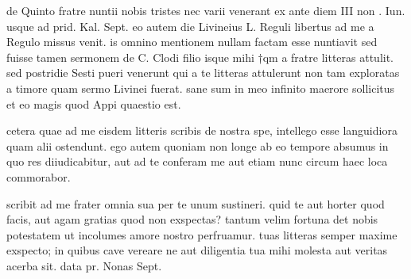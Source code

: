 


 de Quinto fratre nuntii nobis tristes nec varii venerant ex ante diem III non . Iun. usque ad prid. Kal. Sept. eo autem die Livineius L. Reguli libertus ad me a Regulo missus venit. is omnino mentionem nullam factam esse nuntiavit sed fuisse tamen sermonem de C. Clodi filio isque mihi †qm a fratre litteras attulit. sed postridie Sesti pueri venerunt qui a te litteras attulerunt non tam exploratas a timore quam sermo Livinei fuerat. sane sum in meo infinito maerore sollicitus et eo magis quod Appi quaestio est.

 cetera quae ad me eisdem litteris scribis de nostra spe, intellego esse languidiora quam alii ostendunt. ego autem quoniam non longe ab eo tempore absumus in quo res diiudicabitur, aut ad te conferam me aut etiam nunc circum haec loca commorabor.

 scribit ad me frater omnia sua per te unum sustineri. quid te aut horter quod facis, aut agam gratias quod non exspectas? tantum velim fortuna det nobis potestatem ut incolumes amore nostro perfruamur. tuas litteras semper maxime exspecto; in quibus cave vereare ne aut diligentia tua mihi molesta aut veritas acerba sit. data pr. Nonas Sept.

